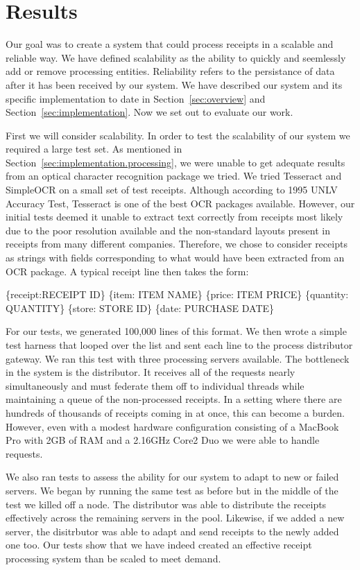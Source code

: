 \section{Results}
\label{sec:results}

Our goal was to create a system that could process receipts in a
scalable and reliable way. We have defined scalability as the ability
to quickly and seemlessly add or remove processing
entities. Reliability refers to the persistance of data after it has
been received by our system. We have described our system and its
specific implementation to date in Section~\ref{sec:overview} and
Section~\ref{sec:implementation}. Now we set out to evaluate our work.

First we will consider scalability. In order to test the scalability
of our system we required a large test set. As mentioned in
Section~\ref{sec:implementation.processing}, we were unable to get
adequate results from an optical character recognition package we
tried. We tried Tesseract and SimpleOCR on a small set of test
receipts. Although according to 1995 UNLV Accuracy Test, Tesseract is
one of the best OCR packages available. However, our initial tests
deemed it unable to extract text correctly from receipts most likely
due to the poor resolution available and the non-standard layouts
present in receipts from many different companies. Therefore, we chose to consider receipts as strings with fields corresponding to what would have been extracted from an OCR package. A typical receipt line then takes the form:

\begin{centering}
\{receipt:RECEIPT ID\} \{item: ITEM NAME\} \{price: ITEM PRICE\} \{quantity: QUANTITY\} \{store: STORE ID\} \{date: PURCHASE DATE\}
\end{centering}

For our tests, we generated 100,000 lines of this format. We then
wrote a simple test harness that looped over the list and sent each
line to the process distributor gateway. We ran this test with three
processing servers available. The bottleneck in the system is the
distributor. It receives all of the requests nearly simultaneously and
must federate them off to individual threads while maintaining a queue
of the non-processed receipts. In a setting where there are hundreds
of thousands of receipts coming in at once, this can become a
burden. However, even with a modest hardware configuration consisting
of a MacBook Pro with 2GB of RAM and a 2.16GHz Core2 Duo we were able
to handle  requests. 

We also ran tests to assess the ability for our system to adapt to new
or failed servers. We began by running the same test as before but in
the middle of the test we killed off a node. The distributor was able
to distribute the receipts effectively across the remaining servers in
the pool. Likewise, if we added a new server, the disitrbutor was able
to adapt and send receipts to the newly added one too. Our tests show
that we have indeed created an effective receipt processing system
than be scaled to meet demand.
